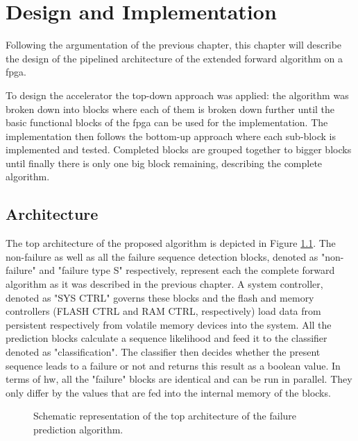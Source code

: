 \documentclass[mscthesis]{usiinfthesis}
\begin{document}
\chapter{Design and Implementation}
\label{ch:design}
\glsresetall %

Following the argumentation of the previous chapter, this chapter will describe
the design of the pipelined architecture of the extended forward algorithm on
a \gls{fpga}.

To design the accelerator the top-down approach was applied: the algorithm was
broken down into blocks where each of them is broken down further until the
basic functional blocks of the \gls{fpga} can be used for the implementation.
The implementation then follows the bottom-up approach where each sub-block is
implemented and tested. Completed blocks are grouped together to bigger blocks
until finally there is only one big block remaining, describing the complete
algorithm.

\section{Architecture}
\label{ch:design_arch}

The top architecture of the proposed algorithm is depicted in Figure
\ref{fig:arch_top}. The non-failure as well as all the failure sequence
detection blocks, denoted as "non-failure" and "failure type S" respectively,
represent each the complete forward algorithm as it was described in the
previous chapter. A system controller, denoted as "SYS CTRL" governs these
blocks and the flash and memory controllers (FLASH CTRL and RAM CTRL,
respectively) load data from persistent respectively from volatile memory
devices into the system. All the prediction blocks calculate a sequence
likelihood and feed it to the classifier denoted as "classification". The
classifier then decides whether the present sequence leads to a failure or not
and returns this result as a boolean value. In terms of \gls{hw}, all the
"failure" blocks are identical and can be run in parallel. They only differ by
the values that are fed into the internal memory of the blocks.

\begin{figure}
    \centering
    
    \caption{Schematic representation of the top architecture of the failure
        prediction algorithm.}
    \label{fig:arch_top}
\end{figure}
\end{document}
